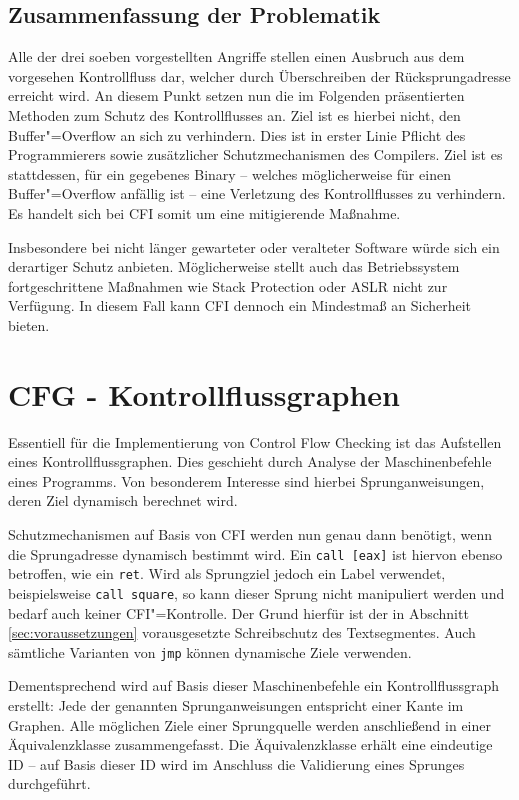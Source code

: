 \subsection{Zusammenfassung der Problematik}

Alle der drei soeben vorgestellten Angriffe stellen einen Ausbruch aus dem vorgesehen Kontrollfluss dar, welcher durch Überschreiben der Rücksprungadresse erreicht wird. An diesem Punkt setzen nun die im Folgenden präsentierten Methoden zum Schutz des Kontrollflusses an. Ziel ist es hierbei nicht, den Buffer"=Overflow an sich zu verhindern. Dies ist in erster Linie Pflicht des Programmierers sowie zusätzlicher Schutzmechanismen des Compilers. Ziel ist es stattdessen, für ein gegebenes Binary -- welches möglicherweise für einen Buffer"=Overflow anfällig ist -- eine Verletzung des Kontrollflusses zu verhindern. Es handelt sich bei CFI somit um eine mitigierende Maßnahme.


Insbesondere bei nicht länger gewarteter oder veralteter Software würde sich ein derartiger Schutz anbieten. Möglicherweise stellt auch das Betriebssystem fortgeschrittene Maßnahmen wie Stack Protection oder ASLR nicht zur Verfügung. In diesem Fall kann CFI dennoch ein Mindestmaß an Sicherheit bieten.


\section{CFG - Kontrollflussgraphen}

Essentiell für die Implementierung von Control Flow Checking ist das Aufstellen eines Kontrollflussgraphen. Dies geschieht durch Analyse der Maschinenbefehle eines Programms. Von besonderem Interesse sind hierbei Sprunganweisungen, deren Ziel dynamisch berechnet wird.

Schutzmechanismen auf Basis von CFI werden nun genau dann benötigt, wenn die Sprungadresse dynamisch bestimmt wird. Ein \texttt{call [eax]} ist hiervon ebenso betroffen, wie ein \texttt{ret}. Wird als Sprungziel jedoch ein Label verwendet, beispielsweise \texttt{call square}, so kann dieser Sprung nicht manipuliert werden und bedarf auch keiner CFI"=Kontrolle. Der Grund hierfür ist der in Abschnitt \ref{sec:voraussetzungen} vorausgesetzte Schreibschutz des Textsegmentes. Auch sämtliche Varianten von \texttt{jmp} können dynamische Ziele verwenden.

Dementsprechend wird auf Basis dieser Maschinenbefehle ein Kontrollflussgraph erstellt: Jede der genannten Sprunganweisungen entspricht einer Kante im Graphen. Alle möglichen Ziele einer Sprungquelle werden anschließend in einer Äquivalenzklasse zusammengefasst. Die Äquivalenzklasse erhält eine eindeutige ID -- auf Basis dieser ID wird im Anschluss die Validierung eines Sprunges durchgeführt.


